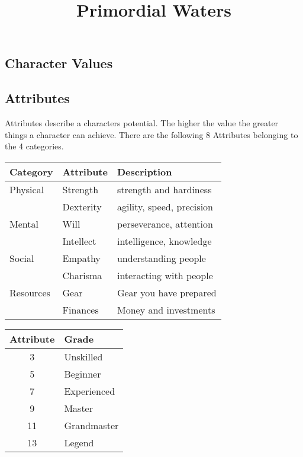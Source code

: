 \documentclass[11pt]{article}
\date{}
\title{Primordial Waters}
\begin{document}
\maketitle
{

\begin{multicols}{2}[]


\section{Character Values}
\label{sec:orge836afe}
\subsection{Attributes}
\label{sec:org90a80f8}
Attributes describe a characters potential. The higher the value the greater things a character can achieve. There are the following 8 Attributes belonging to the 4 categories.

\begin{center}
\begin{tabular}{lll}
\textbf{Category} & \textbf{Attribute} & \textbf{Description}\\
\hline
Physical & Strength & strength and hardiness\\
 & Dexterity & agility, speed, precision\\
\hline
Mental & Will & perseverance, attention\\
 & Intellect & intelligence, knowledge\\
\hline
Social & Empathy & understanding people\\
 & Charisma & interacting with people\\
\hline
Resources & Gear & Gear you have prepared\\
 & Finances & Money and investments\\
\end{tabular}
\end{center}

\begin{center}
\begin{tabular}{c|l}
\textbf{Attribute} & \textbf{Grade}\\
\hline
3 & Unskilled\\
5 & Beginner\\
7 & Experienced\\
9 & Master\\
11 & Grandmaster\\
13 & Legend\\
\end{tabular}
\end{center}


\end{multicols}}
\end{document}
